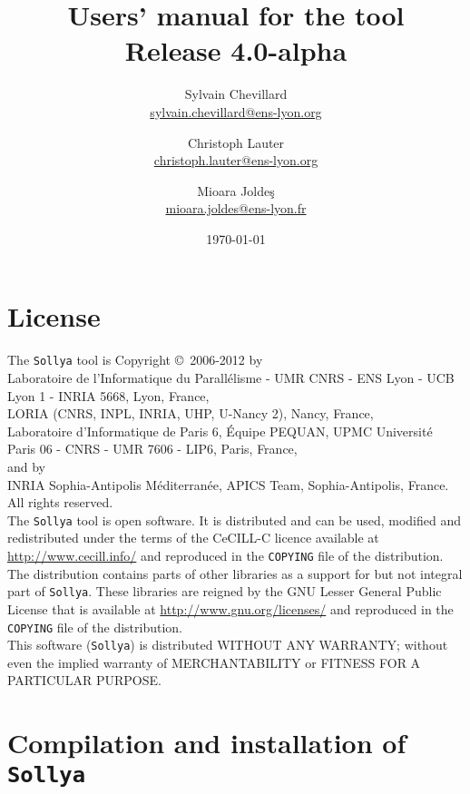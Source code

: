 \documentclass[a4paper]{article}
\title{Users' manual for the \sollya tool \\ {\large Release 4.0-alpha}}
\author{Sylvain Chevillard \\ \small{\url{sylvain.chevillard@ens-lyon.org}} \and Christoph Lauter \\ \small{\url{christoph.lauter@ens-lyon.org}} \and Mioara Jolde\c{s} \\ \small{\url{mioara.joldes@ens-lyon.fr}} }
\date{\today}
\newcommand{\sollya}{\texttt{Sollya}\xspace}
\begin{document}
\maketitle

\section*{License}

The \sollya tool is Copyright \copyright~2006-2012 by \vspace{2mm} \\
\indent Laboratoire de
l'Informatique du Parall\'elisme - UMR CNRS - ENS Lyon - UCB Lyon 1 -
INRIA 5668, Lyon, France, \vspace{2mm} \\
\indent LORIA (CNRS, INPL, INRIA, UHP, U-Nancy 2), Nancy, France, \vspace{2mm} \\
\indent Laboratoire d'Informatique de Paris 6, \'Equipe PEQUAN,
UPMC Universit\'e Paris 06 - CNRS - UMR 7606 - LIP6, Paris, France,\vspace{2mm} \\ and by \vspace{2mm} \\
\indent INRIA Sophia-Antipolis M\'editerran\'ee, APICS Team, Sophia-Antipolis, France. \vspace{2mm} \\
All rights reserved.\\[0.2cm]

\noindent The \sollya tool is open software. It is distributed and can be used,
modified and redistributed under the terms of the CeCILL-C licence
available at \url{http://www.cecill.info/} and reproduced in the
\texttt{COPYING} file of the distribution. The distribution contains
parts of other libraries as a support for but not integral part of
\sollya. These libraries are reigned by the GNU Lesser General Public
License that is available at \url{http://www.gnu.org/licenses/} and
reproduced in the \texttt{COPYING} file of the distribution.\\[0.2cm]

\noindent This software (\sollya) is distributed WITHOUT ANY WARRANTY; without even the 
implied warranty of MERCHANTABILITY or FITNESS FOR A PARTICULAR PURPOSE.

\tableofcontents

\section{Compilation and installation of \sollya}
\end{document}
